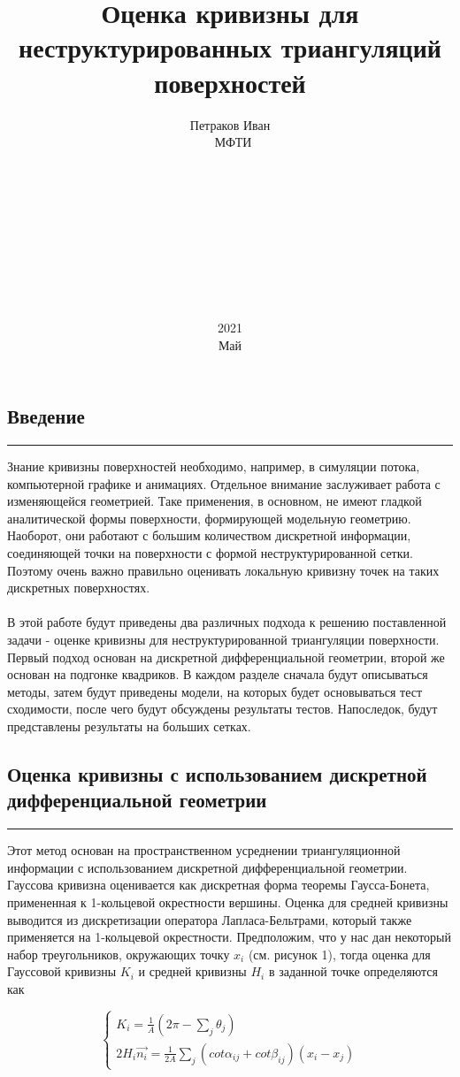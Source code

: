 \documentclass[12pt,a4paper, titlepage]{article}
\title{Оценка кривизны для неструктурированных триангуляций поверхностей}
\date{2021\\Май}
\author{Петраков Иван\\\ МФТИ\\\\\\\\\\\\\\\\\\\\}
\begin{document}
\maketitle

\subsection*{Введение}
\noindent\rule{\textwidth}{1pt}
Знание кривизны поверхностей необходимо, например, в симуляции потока, компьютерной графике и анимациях. Отдельное внимание заслуживает работа с изменяющейся геометрией. Таке применения, в основном, не имеют гладкой аналитической формы поверхности, формирующей модельную геометрию. Наоборот, они работают с большим количеством дискретной информации, соединяющей точки на поверхности с формой неструктурированной сетки. Поэтому очень важно правильно оценивать локальную кривизну точек на таких дискретных поверхностях.
\\
\\
В этой работе будут приведены два различных подхода к решению поставленной задачи - оценке кривизны для неструктурированной триангуляции поверхности. Первый подход основан на дискретной дифференциальной геометрии, второй же основан на подгонке квадриков. В каждом разделе сначала будут описываться методы, затем будут приведены модели, на которых будет основываться тест сходимости, после чего будут обсуждены результаты тестов. Напоследок, будут представлены результаты на больших сетках.

\subsection*{Оценка кривизны с использованием дискретной дифференциальной геометрии}
\noindent\rule{\textwidth}{1pt}
Этот метод основан на пространственном усреднении триангуляционной информации с использованием дискретной дифференциальной геометрии. Гауссова кривизна оценивается как дискретная форма теоремы Гаусса-Бонета, примененная к 1-кольцевой окрестности вершины. Оценка для средней кривизны выводится из дискретизации оператора Лапласа-Бельтрами, который также применяется на 1-кольцевой окрестности. Предположим, что у нас дан некоторый набор треугольников, окружающих точку $x_i$ (см. рисунок 1), тогда оценка для Гауссовой кривизны $K_i$ и средней кривизны $H_i$ в заданной точке определяются как

\begin{equation}
\begin{cases}
K_i = \frac{1}{A}(2 \pi - \sum_j{\theta_j})
\\
2 H_i \vec{n_i} = \frac{1}{2 A} \sum_j{(cot \alpha_{ij} + cot \beta_{ij})}(x_i - x_j)
\end{cases}
\end{equation}
\end{document}
